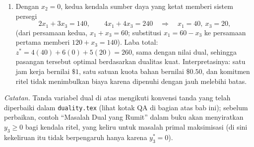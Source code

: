 \begin{enumerate}
\begin{itemize}
\item Pada $\y^* = (1, \tfrac12, 0)$: kendala $x_1$ ketat ($2 + 2 + 0 = 4$), kendala $x_3$ ketat ($3 + 2 + 0 = 5$), dan kendala $x_2$ longgar ($4 + 3 + 0 = 7 > 6$) $\Rightarrow x_2^* = 0$. Jadi, kandidat variabel basis adalah $x_1$ dan $x_3$.
\end{itemize}
\item Dengan $x_2 = 0$, kedua kendala sumber daya yang ketat memberi sistem persegi
\[
2x_1 + 3x_3 = 140, \qquad 4x_1 + 4x_3 = 240
\quad\Longrightarrow\quad x_1 = 40, \ x_3 = 20,
\]
(dari persamaan kedua, $x_1 + x_3 = 60$; substitusi $x_1 = 60 - x_3$ ke persamaan pertama memberi $120 + x_3 = 140$). Laba total: $z^* = 4(40) + 6(0) + 5(20) = 260$, sama dengan nilai dual, sehingga pasangan tersebut optimal berdasarkan dualitas kuat. Interpretasinya: satu jam kerja bernilai $\$1$, satu satuan kuota bahan bernilai $\$0.50$, dan komitmen ritel tidak menimbulkan biaya karena dipenuhi dengan jauh melebihi batas.
\end{enumerate}

\emph{Catatan.} Tanda variabel dual di atas mengikuti konvensi tanda yang telah diperbaiki dalam \texttt{duality.tex} (lihat kotak QA di bagian atas bab ini); sebelum perbaikan, contoh ``Masalah Dual yang Rumit'' dalam buku akan menyiratkan $y_3 \ge 0$ bagi kendala ritel, yang keliru untuk masalah primal maksimisasi (di sini kekeliruan itu tidak berpengaruh hanya karena $y_3^* = 0$).
